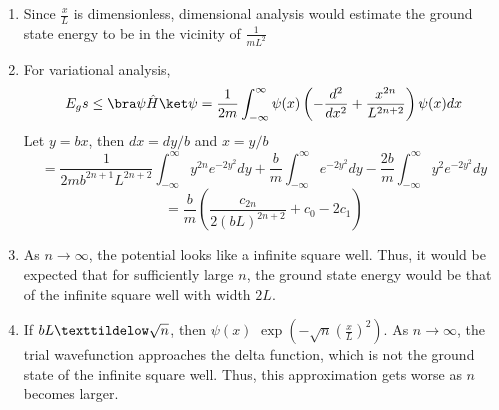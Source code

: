 \begin{sol}
\begin{enumerate}[label=\textbf{(\alph*)}]
\item
Since $\frac{x}{L}$ is dimensionless, dimensional analysis would estimate the ground state energy to be in the vicinity of $\frac{1}{mL^2}$
\item
For variational analysis, 
$$E_gs\leq\bra\psi\hat H\ket\psi=\frac{1}{2m}\int_{-\infty}^\infty \psi(x)\left(-\frac{d^2}{dx^2}+\frac{x^{2n}}{L^{2n+2}}\right)\psi(x)dx$$
Let $y=bx$, then $dx=dy/b$ and $x=y/b$
$$=\frac{1}{2mb^{2n+1}L^{2n+2}}\int_{-\infty}^\infty y^{2n}e^{-2y^2}dy+\frac{b}{m}\int_{-\infty}^\infty e^{-2y^2}dy-\frac{2b}{m}\int_{-\infty}^\infty y^2e^{-2y^2}dy$$ $$=\frac{b}{m}\left(\frac{c_{2n}}{2(bL)^{2n+2}}+c_0-2c_1\right)$$
\item
As $n\to\infty$, the potential looks like a infinite square well. Thus, it would be expected that for sufficiently large $n$, the ground state energy would be that of the infinite square well with width $2L$.
\item
If $bL\texttildelow\sqrt{n}$,  then $\psi(x)\text{~}\exp\left(-\sqrt{n}(\frac{x}{L})^2\right)$. As $n\to\infty$, the trial wavefunction approaches the delta function, which is not the ground state of the infinite square well. Thus, this approximation gets worse as $n$ becomes larger.
\end{enumerate}
\end{sol}